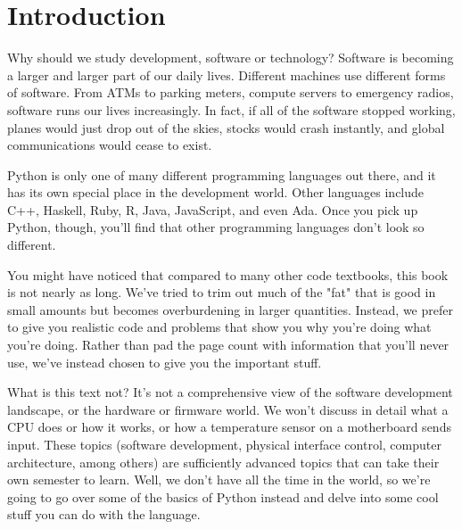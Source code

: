 \chapter{Introduction}
Why should we study development, software or technology? Software is becoming a larger and larger part of our daily lives. Different machines use different forms of software. From ATMs to parking meters, compute servers to emergency radios, software runs our lives increasingly. In fact, if all of the software stopped working, planes would just drop out of the skies, stocks would crash instantly, and global communications would cease to exist.\par
Python is only one of many different programming languages out there, and it has its own special place in the development world. Other languages include C++, Haskell, Ruby, R, Java, JavaScript, and even Ada. Once you pick up Python, though, you’ll find that other programming languages don’t look so different.\par
You might have noticed that compared to many other code textbooks, this book is not nearly as long. We've tried to trim out much of the "fat" that is good in small amounts but becomes overburdening in larger quantities. Instead, we prefer to give you realistic code and problems that show you why you're doing what you're doing. Rather than pad the page count with information that you'll never use, we've instead chosen to give you the important stuff.\par
What is this text not? It’s not a comprehensive view of the software development landscape, or the hardware or firmware world. We won’t discuss in detail what a CPU does or how it works, or how a temperature sensor on a motherboard sends input. These topics (software development, physical interface control, computer architecture, among others) are sufficiently advanced topics that can take their own semester to learn. Well, we don't have all the time in the world, so we're going to go over some of the basics of Python instead and delve into some cool stuff you can do with the language.\par
